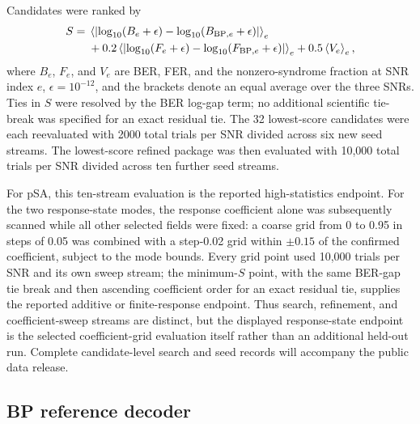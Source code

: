 \documentclass[aps,prapplied,preprint,superscriptaddress,longbibliography,floatfix]{revtex4-2}
\newcommand{\psa}{pSA}
\begin{document}
Candidates were ranked by
\begin{align*}
S={}&\left\langle\left|\log_{10}(B_e+\epsilon)-\log_{10}(B_{\mathrm{BP},e}+\epsilon)\right|\right\rangle_e \notag\\
&+0.2\left\langle\left|\log_{10}(F_e+\epsilon)-\log_{10}(F_{\mathrm{BP},e}+\epsilon)\right|\right\rangle_e
+0.5\left\langle V_e\right\rangle_e,
\end{align*}
where $B_e$, $F_e$, and $V_e$ are BER, FER, and the nonzero-syndrome fraction at SNR index $e$, $\epsilon=10^{-12}$, and the brackets denote an equal average over the three SNRs.  Ties in $S$ were resolved by the BER log-gap term; no additional scientific tie-break was specified for an exact residual tie.  The 32 lowest-score candidates were each reevaluated with 2000 total trials per SNR divided across six new seed streams.  The lowest-score refined package was then evaluated with 10,000 total trials per SNR divided across ten further seed streams.

For \psa{}, this ten-stream evaluation is the reported high-statistics endpoint.  For the two response-state modes, the response coefficient alone was subsequently scanned while all other selected fields were fixed: a coarse grid from 0 to 0.95 in steps of 0.05 was combined with a step-0.02 grid within $\pm0.15$ of the confirmed coefficient, subject to the mode bounds.  Every grid point used 10,000 trials per SNR and its own sweep stream; the minimum-$S$ point, with the same BER-gap tie break and then ascending coefficient order for an exact residual tie, supplies the reported additive or finite-response endpoint.  Thus search, refinement, and coefficient-sweep streams are distinct, but the displayed response-state endpoint is the selected coefficient-grid evaluation itself rather than an additional held-out run.  Complete candidate-level search and seed records will accompany the public data release.

\subsection{BP reference decoder}
\end{document}

